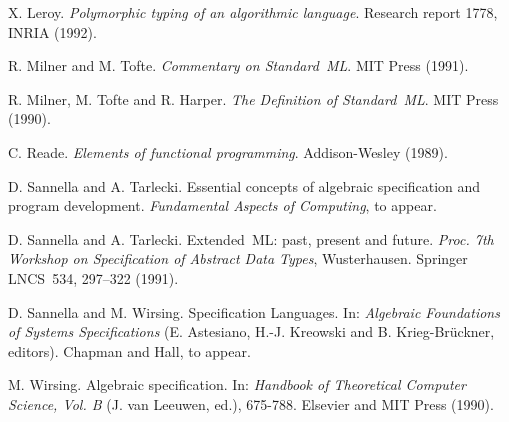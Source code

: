 \begin{thebibliography}{10}
 X. Leroy.
{\it Polymorphic typing of an algorithmic language}. 
Research report 1778, INRIA (1992).

 R. Milner and M. Tofte.
{\it Commentary on Standard~ML}.
MIT Press (1991).

 R. Milner, M. Tofte and R. Harper.
{\it The Definition of Standard~ML}.
MIT Press (1990).

 C. Reade.
{\it Elements of functional programming}.
Addison-Wesley (1989).

 D. Sannella and A. Tarlecki.
Essential concepts of algebraic specification and program development. 
{\it Fundamental Aspects of Computing}, to appear.

 D. Sannella and A. Tarlecki.
Extended~ML: past, present and future.
{\it Proc. 7th Workshop on Specification of Abstract Data Types}, Wusterhausen.
Springer LNCS~534, 297--322 (1991).

 D. Sannella and M. Wirsing.
Specification Languages. In:
{\it Algebraic Foundations of Systems Specifications}
(E. Astesiano, H.-J. Kreowski and B. Krieg-Br\"uckner, editors).
Chapman and Hall, to appear.

 M. Wirsing.
Algebraic specification. In: 
{\it Handbook of Theoretical Computer Science, Vol. B}
(J. van Leeuwen, ed.), 675-788. Elsevier and MIT Press (1990).

                                 
\end{thebibliography}





